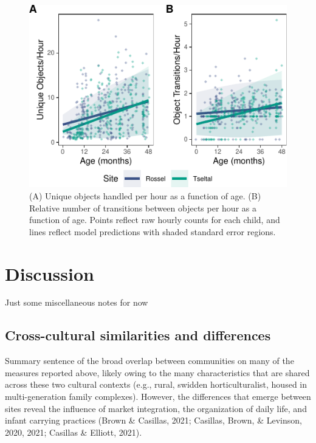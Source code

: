\documentclass[10pt, letterpaper]{article}
\newenvironment{CodeChunk}{}{}
\begin{document}
\begin{CodeChunk}
\begin{figure}[!ht]

{\centering \includegraphics{figs/age-effects-fig-1} 

}

\caption[(A) Unique objects handled per hour as a function of age]{(A) Unique objects handled per hour as a function of age. (B) Relative number of transitions between objects per hour as a function of age. Points reflect raw hourly counts for each child, and lines reflect model predictions with shaded standard error regions.}\label{fig:age-effects-fig}
\end{figure}
\end{CodeChunk}

\hypertarget{discussion}{%
\section{Discussion}\label{discussion}}

Just some miscellaneous notes for now

\hypertarget{cross-cultural-similarities-and-differences}{%
\subsection{Cross-cultural similarities and
differences}\label{cross-cultural-similarities-and-differences}}

Summary sentence of the broad overlap between communities on many of the
measures reported above, likely owing to the many characteristics that
are shared across these two cultural contexts (e.g., rural, swidden
horticulturalist, housed in multi-generation family complexes). However,
the differences that emerge between sites reveal the influence of market
integration, the organization of daily life, and infant carrying
practices (Brown \& Casillas, 2021; Casillas, Brown, \& Levinson, 2020,
2021; Casillas \& Elliott, 2021).
\end{document}
